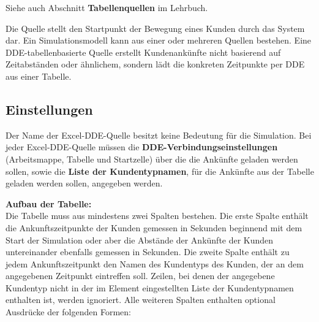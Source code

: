 Siehe auch Abschnitt \textbf{Tabellenquellen} im Lehrbuch.

Die Quelle stellt den Startpunkt der Bewegung eines Kunden durch das System dar.
Ein Simulationsmodell kann aus einer oder mehreren Quellen bestehen.
Eine DDE-tabellenbasierte Quelle erstellt Kundenankünfte nicht basierend auf
Zeitabständen oder ähnlichem, sondern lädt die konkreten Zeitpunkte per DDE
aus einer Tabelle.

\subsection*{Einstellungen}

Der Name der Excel-DDE-Quelle besitzt keine Bedeutung für die Simulation.
Bei jeder Excel-DDE-Quelle müssen die \textbf{DDE-Verbindungseinstellungen}
(Arbeitsmappe, Tabelle und Startzelle) über die die Ankünfte geladen werden sollen,
sowie die \textbf{Liste der Kundentypnamen},
für die Ankünfte aus der Tabelle geladen werden sollen, angegeben werden.

\textbf{Aufbau der Tabelle:}~\\
Die Tabelle muss aus mindestens zwei Spalten bestehen. Die erste Spalte enthält die Ankunftszeitpunkte
der Kunden gemessen in Sekunden beginnend mit dem Start der Simulation oder aber die Abstände
der Ankünfte der Kunden untereinander ebenfalls gemessen in Sekunden. Die zweite Spalte
enthält zu jedem Ankunftszeitpunkt den Namen des Kundentyps des Kunden, der an dem
angegebenen Zeitpunkt eintreffen soll. Zeilen, bei denen der angegebene Kundentyp
nicht in der im Element eingestellten Liste der Kundentypnamen enthalten ist, werden ignoriert.
Alle weiteren Spalten enthalten optional Ausdrücke der folgenden Formen:

